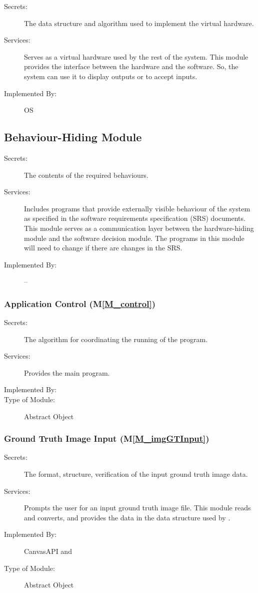 \documentclass[12pt, titlepage]{article}
\newcommand{\mref}[1]{M\ref{#1}}
\begin{document}
\begin{description}
\item[Secrets:]The data structure and algorithm used to implement the virtual
  hardware.
\item[Services:]Serves as a virtual hardware used by the rest of the
  system. This module provides the interface between the hardware and the
  software. So, the system can use it to display outputs or to accept inputs.
\item[Implemented By:] OS
\end{description}

\subsection{Behaviour-Hiding Module}

\begin{description}
\item[Secrets:] The contents of the required behaviours.
\item[Services:] Includes programs that provide externally visible behaviour of
  the system as specified in the software requirements specification (SRS)
  documents. This module serves as a communication layer between the
  hardware-hiding module and the software decision module. The programs in this
  module will need to change if there are changes in the SRS.
\item[Implemented By:] --
\end{description}


\subsubsection{Application Control (\mref{M_control})}
\begin{description}
\item[Secrets:] The algorithm for coordinating the running of the program.
\item[Services:] Provides the main program.
\item[Implemented By:] \progname{}
\item[Type of Module:] Abstract Object
\end{description}


\subsubsection{Ground Truth Image Input (\mref{M_imgGTInput})}
\begin{description}
\item[Secrets:] The format, structure, verification of the input ground truth image data.
\item[Services:] Prompts the user for an input ground truth image file. This module reads and
  converts, and provides the data in the data structure used by \progname{}.
\item[Implemented By:] CanvasAPI and \progname{}
\item[Type of Module:] Abstract Object
\end{description}
\end{document}
